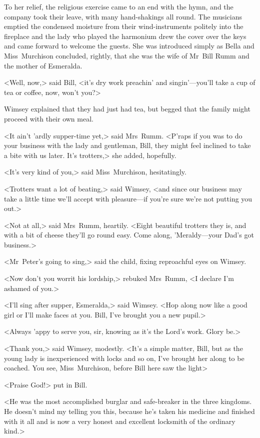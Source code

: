 To her relief, the religious exercise came to an end with the hymn, and the company took their leave, with many hand-shakings all round. The musicians emptied the condensed moisture from their wind-instruments politely into the fireplace and the lady who played the harmonium drew the cover over the keys and came forward to welcome the guests. She was introduced simply as Bella and Miss~Murchison concluded, rightly, that she was the wife of Mr~Bill Rumm and the mother of Esmeralda.

<Well, now,> said Bill, <it's dry work preachin' and singin'—you'll take a cup of tea or coffee, now, won't you?>

Wimsey explained that they had just had tea, but begged that the family might proceed with their own meal.

<It ain't 'ardly supper-time yet,> said Mrs~Rumm. <P'raps if you was to do your business with the lady and gentleman, Bill, they might feel inclined to take a bite with us later. It's trotters,> she added, hopefully.

<It's very kind of you,> said Miss~Murchison, hesitatingly.

<Trotters want a lot of beating,> said Wimsey, <and since our business may take a little time we'll accept with pleasure—if you're sure we're not putting you out.>

<Not at all,> said Mrs~Rumm, heartily. <Eight beautiful trotters they is, and with a bit of cheese they'll go round easy. Come along, 'Meraldy—your Dad's got business.>

<Mr~Peter's going to sing,> said the child, fixing reproachful eyes on Wimsey.

<Now don't you worrit his lordship,> rebuked Mrs~Rumm, <I declare I'm ashamed of you.>

<I'll sing after supper, Esmeralda,> said Wimsey. <Hop along now like a good girl or I'll make faces at you. Bill, I've brought you a new pupil.>

<Always 'appy to serve you, sir, knowing as it's the Lord's work. Glory be.>

<Thank you,> said Wimsey, modestly. <It's a simple matter, Bill, but as the young lady is inexperienced with locks and so on, I've brought her along to be coached. You see, Miss~Murchison, before Bill here saw the light\longdash>

<Praise God!> put in Bill.

<He was the most accomplished burglar and safe-breaker in the three kingdoms. He doesn't mind my telling you this, because he's taken his medicine and finished with it all and is now a very honest and excellent locksmith of the ordinary kind.>

